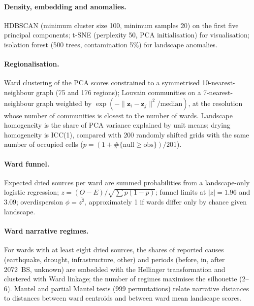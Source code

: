 \paragraph{Density, embedding and anomalies.} HDBSCAN (minimum cluster size 100, minimum samples 20) on the first five principal components; t-SNE (perplexity 50, PCA initialisation) for visualisation; isolation forest (500 trees, contamination 5\%) for landscape anomalies.
\paragraph{Regionalisation.} Ward clustering of the PCA scores constrained to a symmetrised 10-nearest-neighbour graph (75 and 176 regions); Louvain communities on a 7-nearest-neighbour graph weighted by $\exp(-\lVert \mathbf{z}_i-\mathbf{z}_j\rVert^2/\mathrm{median})$, at the resolution whose number of communities is closest to the number of wards. Landscape homogeneity is the share of PCA variance explained by unit means; drying homogeneity is ICC(1), compared with 200 randomly shifted grids with the same number of occupied cells ($p = (1+\#\{\text{null} \geq \text{obs}\})/201$).
\paragraph{Ward funnel.} Expected dried sources per ward are summed probabilities from a landscape-only logistic regression; $z = (O-E)/\sqrt{\sum p(1-p)}$; funnel limits at $|z| = 1.96$ and 3.09; overdispersion $\phi = \overline{z^2}$, approximately 1 if wards differ only by chance given landscape.
\paragraph{Ward narrative regimes.} For wards with at least eight dried sources, the shares of reported causes (earthquake, drought, infrastructure, other) and periods (before, in, after 2072~BS, unknown) are embedded with the Hellinger transformation and clustered with Ward linkage; the number of regimes maximises the silhouette (2--6). Mantel and partial Mantel tests (999 permutations) relate narrative distances to distances between ward centroids and between ward mean landscape scores.

